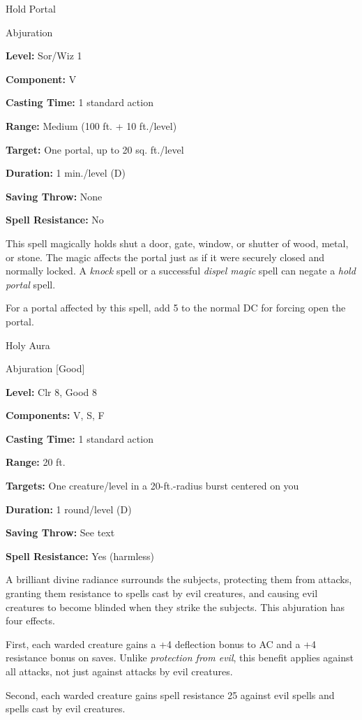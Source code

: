 \documentclass{article}
\begin{document}
\vspace{12pt}
Hold Portal

Abjuration

\textbf{Level:} Sor/Wiz 1

\textbf{Component:} V

\textbf{Casting Time:} 1 standard action

\textbf{Range: }Medium (100 ft. + 10 ft./level)

\textbf{Target:} One portal, up to 20 sq. ft./level

\textbf{Duration:} 1 min./level (D)

\textbf{Saving Throw:} None

\textbf{Spell Resistance:} No

This spell magically holds shut a door, gate, window, or shutter of wood, metal, 
or stone. The magic affects the portal just as if it were securely closed and normally 
locked. A \textit{knock }spell or a successful \textit{dispel magic }spell can 
negate a \textit{hold portal }spell.

For a portal affected by this spell, add 5 to the normal DC for forcing open the 
portal.

\vspace{12pt}
Holy Aura

Abjuration [Good]

\textbf{Level:} Clr 8, Good 8

\textbf{Components:} V, S, F

\textbf{Casting Time:} 1 standard action

\textbf{Range:} 20 ft.

\textbf{Targets:} One creature/level in a 20-ft.-radius burst centered on you

\textbf{Duration:} 1 round/level (D)

\textbf{Saving Throw:} See text

\textbf{Spell Resistance:} Yes (harmless)

A brilliant divine radiance surrounds the subjects, protecting them from attacks, 
granting them resistance to spells cast by evil creatures, and causing evil creatures 
to become blinded when they strike the subjects. This abjuration has four effects.

First, each warded creature gains a +4 deflection bonus to AC and a +4 resistance 
bonus on saves. Unlike \textit{protection from evil}, this benefit applies against 
all attacks, not just against attacks by evil creatures.

Second, each warded creature gains spell resistance 25 against evil spells and 
spells cast by evil creatures.
\end{document}
